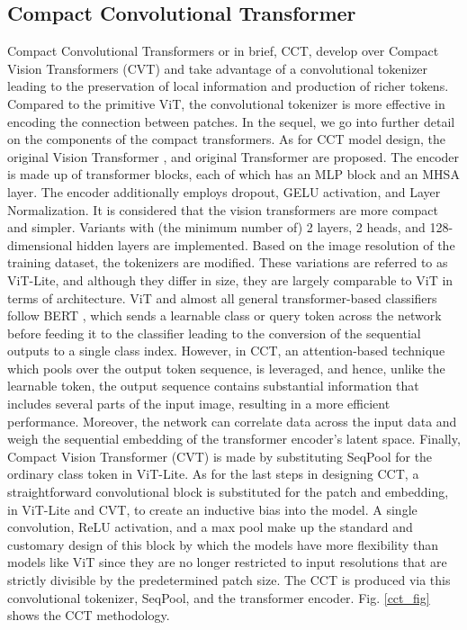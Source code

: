 \documentclass[conference]{IEEEtran}
\begin{document}
\subsection{Compact Convolutional Transformer}
Compact Convolutional Transformers or in brief, CCT, develop over Compact Vision Transformers (CVT) and take advantage of a convolutional tokenizer leading to the preservation of local information and production of richer tokens. Compared to the primitive ViT, the convolutional tokenizer is more effective in encoding the connection between patches. In the sequel, we go into further detail on the components of the compact transformers. As for CCT model design, the original Vision Transformer \cite{dosovitskiy2021image}, and original Transformer \cite{NIPS2017_3f5ee243} are proposed. The encoder is made up of transformer blocks, each of which has an MLP block and an MHSA layer. The encoder additionally employs dropout, GELU activation, and Layer Normalization. It is considered that the vision transformers are more compact and simpler. Variants with (the minimum number of) 2 layers, 2 heads, and 128-dimensional hidden layers are implemented. Based on the image resolution of the training dataset, the tokenizers are modified. These variations are referred to as ViT-Lite, and although they differ in size, they are largely comparable to ViT in terms of architecture. ViT and almost all general transformer-based classifiers follow BERT \cite{devlin2019bert}, which sends a learnable class or query token across the network before feeding it to the classifier leading to the conversion of the sequential outputs to a single class index. However, in CCT, an attention-based technique which pools over the output token sequence, is leveraged, and hence, unlike the learnable token, the output sequence contains substantial information that includes several parts of the input image, resulting in a more efficient performance. Moreover, the network can correlate data across the input data and weigh the sequential embedding of the transformer encoder's latent space. Finally, Compact Vision Transformer (CVT) is made by substituting SeqPool for the ordinary class token in ViT-Lite. As for the last steps in designing CCT, a straightforward convolutional block is substituted for the patch and embedding, in ViT-Lite and CVT, to create an inductive bias into the model. A single convolution, ReLU activation, and a max pool make up the standard and customary design of this block by which the models have more flexibility than models like ViT since they are no longer restricted to input resolutions that are strictly divisible by the predetermined patch size. The CCT is produced via this convolutional tokenizer, SeqPool, and the transformer encoder. Fig. \ref{cct_fig} shows the CCT methodology.
\end{document}
